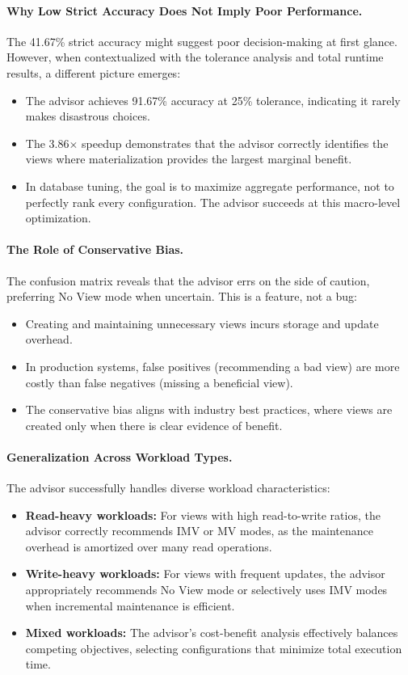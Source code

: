 \paragraph{Why Low Strict Accuracy Does Not Imply Poor Performance.}
The 41.67\% strict accuracy might suggest poor decision-making at first glance. However, when contextualized with the tolerance analysis and total runtime results, a different picture emerges:
\begin{itemize}
    \item The advisor achieves 91.67\% accuracy at 25\% tolerance, indicating it rarely makes disastrous choices.
    \item The 3.86$\times$ speedup demonstrates that the advisor correctly identifies the views where materialization provides the largest marginal benefit.
    \item In database tuning, the goal is to maximize aggregate performance, not to perfectly rank every configuration. The advisor succeeds at this macro-level optimization.
\end{itemize}

\paragraph{The Role of Conservative Bias.}
The confusion matrix reveals that the advisor errs on the side of caution, preferring No View mode when uncertain. This is a feature, not a bug:
\begin{itemize}
    \item Creating and maintaining unnecessary views incurs storage and update overhead.
    \item In production systems, false positives (recommending a bad view) are more costly than false negatives (missing a beneficial view).
    \item The conservative bias aligns with industry best practices, where views are created only when there is clear evidence of benefit.
\end{itemize}

\paragraph{Generalization Across Workload Types.}
The advisor successfully handles diverse workload characteristics:
\begin{itemize}
    \item \textbf{Read-heavy workloads:} For views with high read-to-write ratios, the advisor correctly recommends \ac{IMV} or \ac{MV} modes, as the maintenance overhead is amortized over many read operations.
    \item \textbf{Write-heavy workloads:} For views with frequent updates, the advisor appropriately recommends No View mode or selectively uses \ac{IMV} modes when incremental maintenance is efficient.
    \item \textbf{Mixed workloads:} The advisor's cost-benefit analysis effectively balances competing objectives, selecting configurations that minimize total execution time.
\end{itemize}

